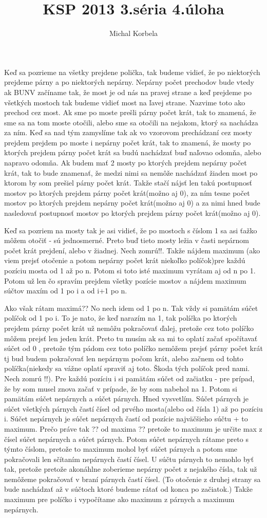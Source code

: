\documentclass[a4paper,11pt]{article}
\title{KSP 2013 3.séria 4.úloha}
\author{Michal Korbela}
\begin{document}
Keď sa pozrieme na všetky  prejdene polička, tak budeme vidieť, že po niektorých prejdeme párny a po niektorých nepárny. Nepárny počet prechodov bude vtedy ak BUNV začíname tak, že most je od nás na pravej strane a keď prejdeme po všetkých mostoch tak budeme vidieť most na ľavej strane. Nazvime toto ako prechod cez most. Ak sme po moste prešli párny počet krát, tak to znamená, že sme sa na tom moste otočili, alebo sme sa otočili na nejakom, ktorý sa nachádza za ním. Keď sa nad tým zamyslíme tak ak vo vzorovom prechádzaní cez mosty prejdem prejdem po moste i nepárny počet krát, tak to znamená, že mosty po ktorých prejdem párny počet krát sa budú nachádzať buď naľovao odomňa, alebo napravo odomňa. Ak budem mať 2 mosty po ktorých prejdem nepárny počet krát, tak to bude znamenať, že medzi nimi sa nemôže nachádzať žiaden most po ktorom by som prešiel párny počet krát. Takže stačí nájsť len takú postupnosť mostov po ktorých prejdem párny počet krát(možno aj 0), za ním tesne počet mostov po ktorých prejdem nepárny počet krát(možno aj 0) a za nimi hned bude nasledovať postupnosť mostov po ktorých prejdem párny počet krát(možno aj 0).

Keď sa pozriem na mosty tak je asi vidieť, že po mostoch s číslom 1 sa asi ťažko môžem otočiť - sú jednosmerné. Preto buď tieto mosty ležia v časti nepárnom počet krát prejdení, alebo v žiadnej. Nech zomrú!!. Takže nájdem maximum (ako viem prejsť otočenie a potom nepárny počet krát niekoľko políčok)pre každú pozíciu mosta od 1 až po n. Potom si toto isté maximum vyrátam aj od n po 1. Potom už len čo spravím prejdem všetky pozície mostov a nájdem maximum súčtov maxím od 1 po i a od i+1 po n.

Ako však rátam maximá?? No nech idem od 1 po n. Tak vždy si pamätám súčet políčok od 1 po i. To je nato, že keď narazím na 1, tak políčka po ktorých prejdem párny počet krát už nemôžu pokračovať ďalej, pretože cez toto políčko  môžem prejsť len jeden krát. Preto tu musím ak sa mi to oplatí začať spočítavať súčet od 0 , pretože tým pádom cez toto políčko nemôžem prejsť párny počet krát tj bud budem pokračovať len nepárnym počom krát, alebo začnem od tohto políčka(niekedy sa vážne oplatí spraviť aj toto. Škoda tých políčok pred nami. Nech zomrú !!). Pre každú pozíciu i si pamätám súčet od začiatku - pre prípad, že by som musel znova začať v prípade, že by som nabehol na 1. Potom si pamätám súčet nepárnych a súčet párnych. Hned vysvetlím. Súčet párnych je súčet všetkých párnych častí čísel od prvého mosta(alebo od čísla 1) až po pozíciu i. Súčet nepárnych je súčet nepárnych častí od pozície najväčšieho súčtu + to maximum. Prečo práve tak ?? od maxima ?? pretože to maximum je určite max z čísel súčet nepárnych a súčet párnych. Potom súčet nepárnych rátame preto s týmto číslom, pretože to maximum mohol byť súčet párnych a potom sme pokračovali len sčítaním nepárnych častí čísel. U súčtu párnych to nemohlo byť tak, pretože pretože akonáhlne zoberieme nepárny počet z nejakého čísla, tak už nemôžeme pokračovať v braní párnych častí čísel. (To otočenie z druhej strany sa bude nachádzať až v súčtoch ktoré budeme rátať od konca po začiatok.) Takže maximum pre políčko i vypočítame ako maximum z párnych a maximum nepárnych.
\end{document}

